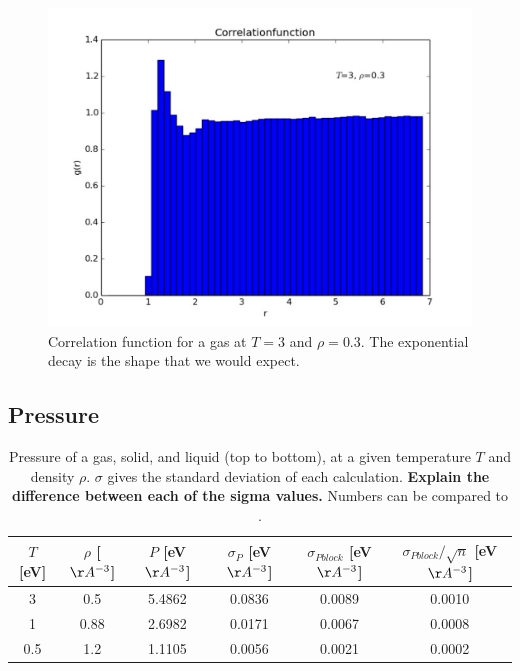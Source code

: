 \documentclass{article}
\begin{document}
\begin{multicols}{2}
\begin{figure}[H]
\begin{center}
\includegraphics[width=\linewidth]{plots/correlationfunctionT3Rho03x.pdf}
\caption{Correlation function for a gas at $T=3$ and $\rho = 0.3$.  The exponential decay is the shape that we would expect.}
\label{corgas}
\end{center}
\end{figure}

\subsection{Pressure}

\begin{table}
\begin{center}
\begin{tabular}{| c | c | c | c | c | c |}
\hline  $T$ [eV] & $\rho$ [$\AA ^{-3}$] & $P$ [eV$\AA ^{-3}$] & $\sigma_{P}$ [eV$\AA ^{-3}$]  & $\sigma_{Pblock}$ [eV$\AA ^{-3}$] & $\sigma_{Pblock}/ \sqrt n$ [eV$\AA ^{-3}$] \\ \hline
  3 & 0.5 & 5.4862 & 0.0836 & 0.0089 & 0.0010 \\ \hline
  1 & 0.88 & 2.6982 & 0.0171 & 0.0067 & 0.0008 \\ \hline
  0.5 & 1.2 & 1.1105 & 0.0056 & 0.0021 & 0.0002 \\ \hline
\end{tabular}
\label{pressuretab}
\caption{Pressure of a gas, solid, and liquid (top to bottom), at a given temperature $T$ and density $\rho$.  $\sigma$ gives the standard deviation of each calculation.  \textbf{Explain the difference between each of the sigma values.}  Numbers can be compared to \cite{thijssen}.}
\end{center}
\end{table}


\end{multicols}
\end{document}
